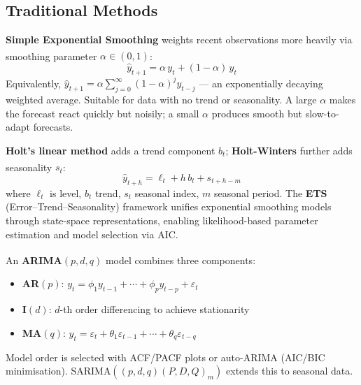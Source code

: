 \subsection{Traditional Methods}

\begin{tcbitemize}[ skin=sectionraster ]

    \tcbitem[title=Exponential Smoothing (SES), raster multicolumn=3]
    \textbf{Simple Exponential Smoothing} weights recent observations more heavily via smoothing parameter $\alpha \in (0,1)$\textsuperscript{\cite[][pp.~75--77]{hyndmanForecastingPrinciples2021}}:
    \begin{equation}
        \hat{y}_{t+1} = \alpha\, y_t + (1-\alpha)\,\hat{y}_t
    \end{equation}
    Equivalently, $\hat{y}_{t+1} = \alpha \sum_{j=0}^{\infty}(1-\alpha)^j y_{t-j}$ --- an exponentially decaying weighted average.
    Suitable for data with no trend or seasonality. A large $\alpha$ makes the forecast react quickly but noisily; a small $\alpha$ produces smooth but slow-to-adapt forecasts.

    \tcbitem[title=Holt-Winters / ETS, raster multicolumn=3]
    \textbf{Holt's linear method} adds a trend component $b_t$; \textbf{Holt-Winters} further adds seasonality $s_t$\textsuperscript{\cite[][pp.~82--95]{hyndmanForecastingPrinciples2021}}:
    \begin{equation}
        \hat{y}_{t+h} = \ell_t + h\,b_t + s_{t+h-m}
    \end{equation}
    where $\ell_t$ is level, $b_t$ trend, $s_t$ seasonal index, $m$ seasonal period.
    The \textbf{ETS} (Error--Trend--Seasonality) framework unifies exponential smoothing models through state-space representations, enabling likelihood-based parameter estimation and model selection via AIC.

    \tcbitem[title=ARIMA Models, raster multicolumn=3]
    An \textbf{ARIMA}$(p,d,q)$ model combines three components\textsuperscript{\cite[][pp.~233--257]{hyndmanForecastingPrinciples2021}}:
    \begin{itemize}
        \item \textbf{AR}$(p)$: $y_t = \phi_1 y_{t-1}+\cdots+\phi_p y_{t-p} + \varepsilon_t$
        \item \textbf{I}$(d)$: $d$-th order differencing to achieve stationarity
        \item \textbf{MA}$(q)$: $y_t = \varepsilon_t + \theta_1\varepsilon_{t-1}+\cdots+\theta_q\varepsilon_{t-q}$
    \end{itemize}
    Model order is selected with ACF/PACF plots or auto-ARIMA (AIC/BIC minimisation).
    SARIMA$((p,d,q)(P,D,Q)_m)$ extends this to seasonal data.


\end{tcbitemize}
